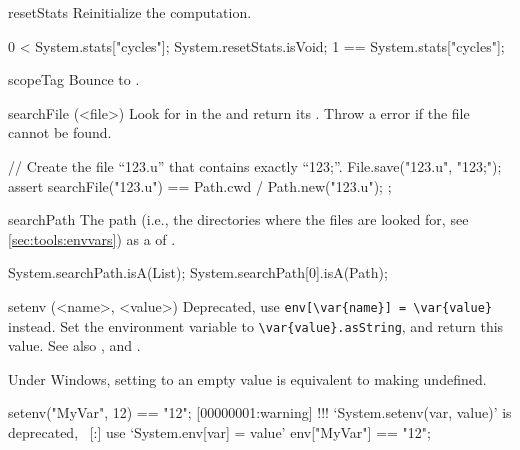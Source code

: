 \begin{urbiscriptapi}
\item[resetStats]%
  Reinitialize the  computation.
\begin{urbiassert}
 0  < System.stats["cycles"];
System.resetStats.isVoid;
 1 == System.stats["cycles"];
\end{urbiassert}


\item[scopeTag] Bounce to .


\item[searchFile](<file>)%
  Look for  in the  and return its
  .  Throw a  error if the
  file cannot be found.
\begin{urbiscript}
// Create the file ``123.u'' that contains exactly ``123;''.
File.save("123.u", "123;");
assert
{
  searchFile("123.u") == Path.cwd / Path.new("123.u");
};
\end{urbiscript}


\item[searchPath] The \urbi path (i.e., the directories where the \us files
  are looked for, see \autoref{sec:tools:envvars}) as a  of
  .
\begin{urbiassert}
System.searchPath.isA(List);
System.searchPath[0].isA(Path);
\end{urbiassert}


\item[setenv](<name>, <value>)%
  Deprecated, use \lstinline|env[\var{name}] = \var{value}| instead.  Set
  the environment variable  to \lstinline|\var{value}.asString|,
  and return this value.  See also ,  and
  .
  \begin{windows}
    Under Windows, setting to an empty value is equivalent to
    making undefined.
  \end{windows}

\begin{urbiassert}
setenv("MyVar", 12) == "12";
[00000001:warning] !!! `System.setenv(var, value)' is deprecated, \
[:]                       use `System.env[var] = value'
env["MyVar"] == "12";
\end{urbiassert}



\end{urbiscriptapi}

